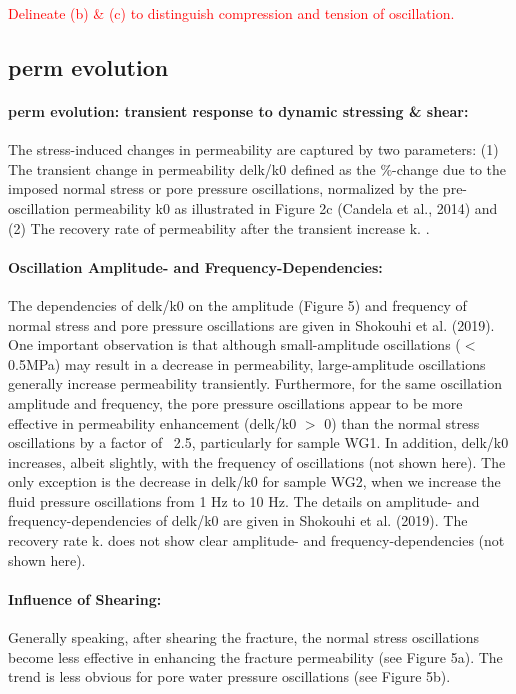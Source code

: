 \documentclass[letterpaper,10pt]{article}
\begin{document}
\textcolor{red}{Delineate (b) \& (c) to distinguish compression and tension of oscillation.\\}

\newpage

\subsection{perm evolution}
\paragraph{perm evolution: transient response to dynamic stressing \& shear:} 
The stress-induced changes in permeability are captured by two parameters: (1) The transient change in permeability delk/k0 defined as the \%-change due to the imposed normal stress or pore pressure oscillations, normalized by the pre-oscillation permeability k0 as illustrated in Figure 2c (Candela et al., 2014) and (2) The recovery rate of permeability after the transient increase k. . 

\paragraph{Oscillation Amplitude- and Frequency-Dependencies:} 
The dependencies of delk/k0 on the amplitude (Figure 5) and frequency of normal stress and pore pressure oscillations are given in Shokouhi et al. (2019). One important observation is that although small-amplitude oscillations ($< $ 0.5MPa) may result in a decrease in permeability, large-amplitude oscillations generally increase permeability transiently. Furthermore, for the same oscillation amplitude and frequency, the pore pressure oscillations appear to be more effective in permeability enhancement (delk/k0 $> $ 0) than the normal stress oscillations by a factor of ~2.5, particularly for sample WG1. In addition, delk/k0
increases, albeit slightly, with the frequency of oscillations (not shown here). The only exception is the decrease in delk/k0 for sample WG2, when we increase the fluid pressure oscillations from 1 Hz to 10 Hz. The details on amplitude- and frequency-dependencies of 
delk/k0 are given in Shokouhi et al. (2019). The recovery rate k. does not show clear amplitude- and frequency-dependencies (not shown here).  

\paragraph{Influence of Shearing:}
Generally speaking, after shearing the fracture, the normal stress oscillations become less effective in enhancing the fracture permeability (see Figure 5a). The trend is less obvious for pore water pressure oscillations (see Figure 5b). 
\end{document}
